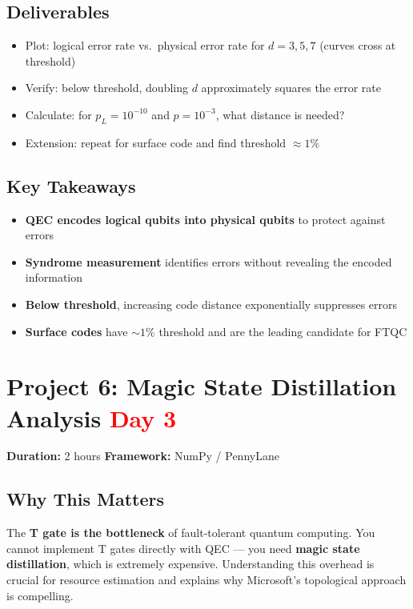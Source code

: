 \documentclass[11pt,a4paper]{article}
\begin{document}
\subsection*{Deliverables}
\begin{itemize}
    \item[\checkmark] Plot: logical error rate vs.\ physical error rate for $d = 3, 5, 7$ (curves cross at threshold)
    \item[\checkmark] Verify: below threshold, doubling $d$ approximately squares the error rate
    \item[\checkmark] Calculate: for $p_L = 10^{-10}$ and $p = 10^{-3}$, what distance is needed?
    \item[\checkmark] Extension: repeat for surface code and find threshold $\approx 1\%$
\end{itemize}

\subsection*{Key Takeaways}
\begin{itemize}
    \item \textbf{QEC encodes logical qubits into physical qubits} to protect against errors
    \item \textbf{Syndrome measurement} identifies errors without revealing the encoded information
    \item \textbf{Below threshold}, increasing code distance exponentially suppresses errors
    \item \textbf{Surface codes} have $\sim 1\%$ threshold and are the leading candidate for FTQC
\end{itemize}


\section{Project 6: Magic State Distillation Analysis \hfill \textcolor{red}{\textbf{Day 3}}}

\begin{questionbox}
\textbf{Duration:} 2 hours \quad \textbf{Framework:} NumPy / PennyLane
\end{questionbox}

\subsection*{Why This Matters}
The \textbf{T gate is the bottleneck} of fault-tolerant quantum computing. You cannot implement T gates directly with QEC --- you need \textbf{magic state distillation}, which is extremely expensive. Understanding this overhead is crucial for resource estimation and explains why Microsoft's topological approach is compelling.
\end{document}
